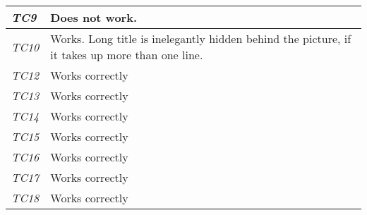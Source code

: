 \begin{minipage}{\linewidth}
\begin{tabular}{ |l|p{70mm}| }
	\it{\cellcolor{gray!25}TC9} & Does not work. \\ \hline
	\it{\cellcolor{gray!25}TC10} & Works. Long title is inelegantly hidden behind the picture, if it takes up more than one line. \\ \hline
	\it{\cellcolor{gray!25}TC12} & Works correctly \\ \hline
	\it{\cellcolor{gray!25}TC13} & Works correctly \\ \hline
	\it{\cellcolor{gray!25}TC14} & Works correctly \\ \hline
	\it{\cellcolor{gray!25}TC15} & Works correctly \\ \hline
	\it{\cellcolor{gray!25}TC16} & Works correctly \\ \hline
	\it{\cellcolor{gray!25}TC17} & Works correctly \\ \hline
	\it{\cellcolor{gray!25}TC18} & Works correctly \\ \hline
	\hline
\end{tabular}
\medskip
\end{minipage}
%
